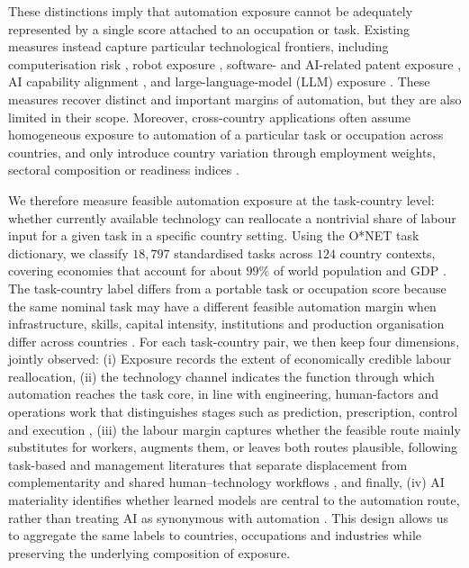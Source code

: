\documentclass[11pt]{article}
\begin{document}
These distinctions imply that automation exposure cannot be adequately represented by a single score attached to an occupation or task. Existing measures instead capture particular technological frontiers, including computerisation risk \citep{frey2017future}, robot exposure \citep{graetz2018robots,acemoglu2020robots}, software- and AI-related patent exposure \citep{Webb2020}, AI capability alignment \citep{BrynjolfssonMitchellRock2018,felten2021occupational}, and large-language-model (LLM) exposure \citep{EloundouEtAl2024}. These measures recover distinct and important margins of automation, but they are also limited in their scope. Moreover, cross-country applications often assume homogeneous exposure to automation of a particular task or occupation across countries, and only introduce country variation through employment weights, sectoral composition or readiness indices \citep{PizzinelliEtAl2023,GmyrekBergBescond2023,CazzanigaEtAl2024GenAI}.

We therefore measure feasible automation exposure at the task-country level: whether currently available technology can reallocate a nontrivial share of labour input for a given task in a specific country setting. Using the O*NET task dictionary, we classify $18{,}797$ standardised tasks across $124$ country contexts, covering economies that account for about $99\%$ of world population and GDP \citep{onet2024,onet_database_29_1}. The task-country label differs from a portable task or occupation score because the same nominal task may have a different feasible automation margin when infrastructure, skills, capital intensity, institutions and production organisation differ across countries \citep{CominHobijn2010,CominMestieri2018TechnologyIncomeDivergence,CaunedoKellerShin2021,CireraCominCruz2024,LewandowskiMadonPark2025DevelopmentStages}. For each task-country pair, we then keep four dimensions, jointly observed: (i) Exposure records the extent of economically credible labour reallocation, (ii) the technology channel indicates the function through which automation reaches the task core, in line with engineering, human-factors and operations work that distinguishes stages such as prediction, prescription, control and execution \citep{ParasuramanSheridanWickens2000Automation,BertsimasKallus2020PredictivePrescriptive}, (iii) the labour margin captures whether the feasible route mainly substitutes for workers, augments them, or leaves both routes plausible, following task-based and management literatures that separate displacement from complementarity and shared human--technology workflows \citep{AcemogluRestrepo2018,RaischKrakowski2021AutomationAugmentation,BrynjolfssonLiRaymond2023GenerativeAIatWork,DellAcquaEtAl2026JaggedFrontier}, and finally, (iv) AI materiality identifies whether learned models are central to the automation route, rather than treating AI as synonymous with automation \citep{BrynjolfssonMitchellRock2018,EloundouEtAl2024,AmershiEtAl2019HumanAIInteraction,SvanbergLiFlemingGoehringThompson2024}. This design allows us to aggregate the same labels to countries, occupations and industries while preserving the underlying composition of exposure.
\end{document}
